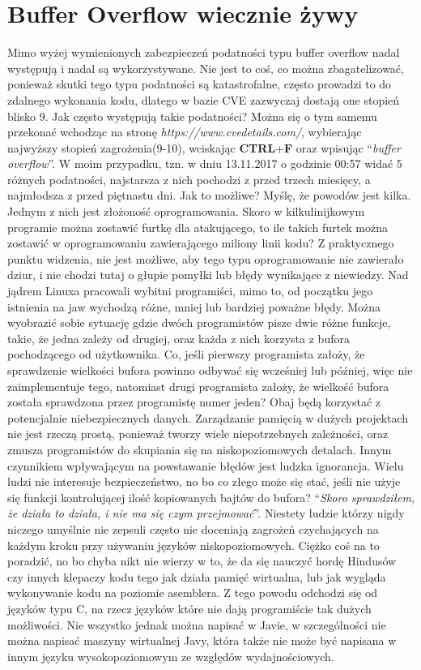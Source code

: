 \documentclass[polish]{kbk}
\begin{document}
\section{Buffer Overflow wiecznie żywy}
Mimo wyżej wymienionych zabezpieczeń podatności typu buffer overflow nadal występują i nadal są wykorzystywane. Nie jest to coś, co można zbagatelizować, ponieważ skutki tego typu podatności są katastrofalne, często prowadzi to do zdalnego wykonania kodu, dlatego w bazie CVE zazwyczaj dostają one stopień blisko 9. Jak często występują takie podatności? Można się o tym samemu przekonać wchodząc na stronę \emph{https://www.cvedetails.com/}, wybierając najwyższy stopień zagrożenia(9-10), wciskając \textbf{CTRL}+\textbf{F} oraz wpisując ``\emph{buffer overflow}''. W moim przypadku, tzn. w dniu 13.11.2017 o godzinie 00:57 widać 5 różnych podatności, najstarsza z nich pochodzi z przed trzech miesięcy, a najmłodsza z przed piętnastu dni. Jak to możliwe?
Myślę, że powodów jest kilka. \newline 
Jednym z nich jest złożoność oprogramowania. Skoro w kilkulinijkowym programie można zostawić furtkę dla atakującego, to ile takich furtek można zostawić w oprogramowaniu zawierającego miliony linii kodu? Z praktycznego punktu widzenia, nie jest możliwe, aby tego typu oprogramowanie nie zawierało dziur, i nie chodzi tutaj o głupie pomyłki lub błędy wynikające z niewiedzy. Nad jądrem Linuxa pracowali wybitni programiści, mimo to, od początku jego istnienia na jaw wychodzą różne, mniej lub bardziej poważne błędy. Można wyobrazić sobie sytuację gdzie dwóch programistów pisze dwie różne funkcje, takie, że jedna zależy od drugiej, oraz każda z nich korzysta z bufora pochodzącego od użytkownika. Co, jeśli pierwszy programista założy, że sprawdzenie wielkości bufora powinno odbywać się wcześniej lub później, więc nie zaimplementuje tego, natomiast drugi programista założy, że wielkość bufora została sprawdzona przez programistę numer jeden? Obaj będą korzystać z potencjalnie niebezpiecznych danych. Zarządzanie pamięcią w dużych projektach nie jest rzeczą prostą, ponieważ tworzy wiele niepotrzebnych zależności, oraz zmusza programistów do skupiania się na niskopoziomowych detalach.  \newline
Innym czynnikiem wpływającym na powstawanie błędów jest ludzka ignorancja. Wielu ludzi nie interesuje bezpieczeństwo, no bo co złego może się stać, jeśli nie użyje się funkcji kontrolującej ilość kopiowanych bajtów do bufora? ``\emph{Skoro sprawdziłem, że działa to działa, i nie ma się czym przejmować}''. Niestety ludzie którzy nigdy niczego umyślnie nie zepsuli często nie doceniają zagrożeń czychających na każdym kroku przy używaniu języków niskopoziomowych. Ciężko coś na to poradzić, no bo chyba nikt nie wierzy w to, że da się nauczyć hordę Hindusów czy innych klepaczy kodu tego jak działa pamięć wirtualna, lub jak wygląda wykonywanie kodu na poziomie asemblera. Z tego powodu odchodzi się od języków typu C, na rzecz języków które nie dają programiście tak dużych możliwości. Nie wszystko jednak można napisać w Javie, w szczególności nie można napisać maszyny wirtualnej Javy, która także nie może być napisana w innym języku wysokopoziomowym ze względów wydajnościowych. \newline
\end{document}
